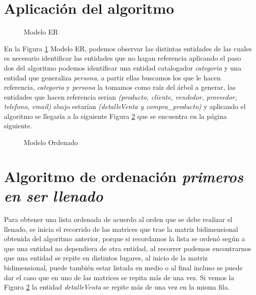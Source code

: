 \section{Aplicaci\'on del algoritmo}
\begin{figure}[H]
\centering
{}
\caption{Modelo ER} 
\label{fig:Modelo ER}
\end{figure}
En la Figura \ref{fig:Modelo ER} Modelo ER, podemos observar las distintas entidades de las cuales es necesario identificar las entidades que no hagan referencia aplicando el paso dos del algoritmo podemos identificar una entidad catalogador \emph{categoria} y una entidad que generaliza \emph{persona}, a partir ellas buscamos los que le hacen referencia, \textit{categoria} y \textit{persona} la tomamos como ra\'iz del \'arbol a generar, las entidades que hacen referencia serian \textit{(producto, cliente, vendedor, proveedor, telefono, email)} abajo estar\'ian \textit{(detalleVenta y compra\_producto)} y aplicando el algoritmo se llegar\'ia a la siguiente Figura \ref{fig:ModeloOrdenado} que se encuentra en la p\'agina siguiente.
\begin{figure}[H]
\centering
{}
\caption{Modelo Ordenado} \label{fig:ModeloOrdenado}
\end{figure}
\section{Algoritmo de ordenaci\'on \textit{primeros en ser llenado}}
\label{Algoritmo de ordenacion primeros en ser llenado}
Para obtener una lista ordenada de acuerdo al orden que se debe realizar el llenado, se inicia el recorrido de las matrices que trae la matriz bidimensional obtenida del algoritmo anterior, porque si recordamos la lista se orden\'o seg\'un a que una entidad no dependiera de otra entidad, al recorrer podemos encontrarnos que una entidad se repite en distintos lugares, al  inicio de la matriz bidimensional, puede tambi\'en estar listada en medio o al final incluso se puede dar el caso que en uno de las matrices se repita m\'as de una vez. Si vemos la Figura \ref{fig:ModeloOrdenado} la entidad \textit{detalleVenta} se repite m\'as de una vez en la misma fila.

